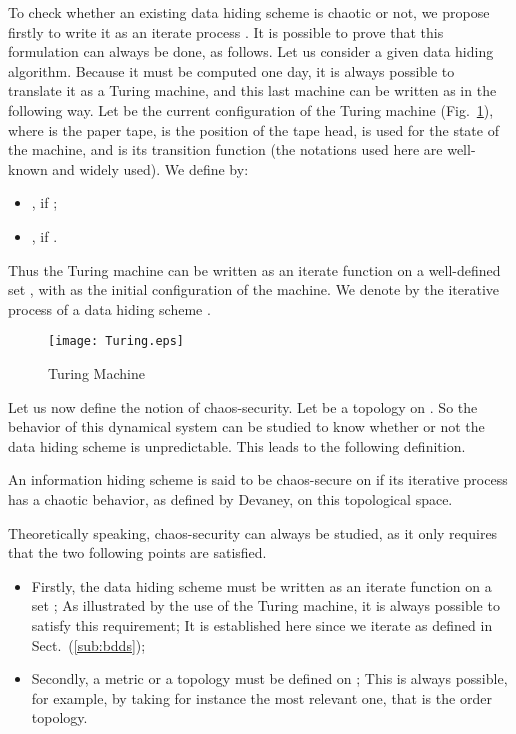 \documentclass{comjnl}
\begin{document}
 To check whether an existing data hiding scheme is chaotic or not, we propose firstly to write it as an iterate process . It is possible to prove that this formulation can always be done, as follows. Let us consider a given data hiding algorithm. Because it must be computed one day, it is always possible to translate it as a Turing machine, and this last machine can be written as  in the following way. Let  be the current configuration of the Turing machine (Fig.~\ref{Turing}), where  is the paper tape,  is the position of the tape head,  is used for the state of the machine, and  is its transition function (the notations used here are well-known and widely used). We define  by:
 \begin{itemize}
 \item , if  ;
 \item ,  if .
 \end{itemize}
 Thus the Turing machine can be written as an iterate function  on a well-defined set , with  as the initial configuration of the machine. We denote by  the iterative process of a data hiding scheme .

 \begin{figure}[h!]
   \centering
\texttt{[image: Turing.eps]}
 \caption{Turing Machine}
 \label{Turing}
 \end{figure}


Let us now define the notion of chaos-security.
Let  be a topology on . So the behavior of this dynamical system can be studied to know whether or not the data hiding scheme is unpredictable. This leads to the following definition.

\begin{definition}
\label{DefinitionChaosSecure}
An information hiding scheme  is said to be chaos-secure on  if its iterative process  has a chaotic behavior, as defined by Devaney, on this topological space.
\end{definition}



Theoretically speaking, chaos-security can always be studied, as it only requires that the two following points are satisfied.
\begin{itemize}
\item Firstly, the data hiding scheme must be written as an iterate function on
  a set ;
As illustrated by the use of the Turing machine, it is always possible to satisfy this requirement; It is established here since we iterate  as defined in
Sect.~(\ref{sub:bdds});

\item Secondly, a metric or a topology must be defined on ; This is always possible, for example, by taking for instance the most relevant one, that is the order topology.
\end{itemize}
\end{document}
